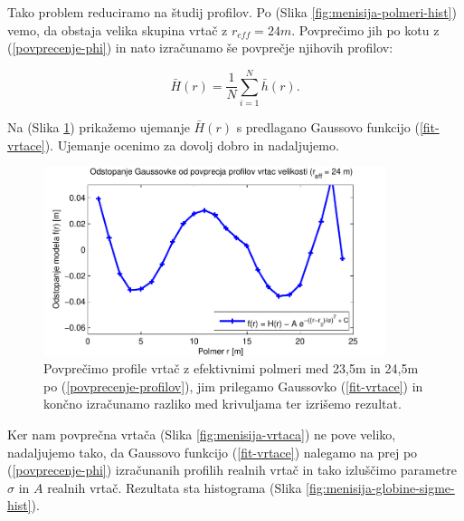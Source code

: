 \documentclass[a4paper, twoside, 12pt]{book}
\begin{document}
Tako problem reduciramo na študij profilov. 
Po (Slika \ref{fig:menisija-polmeri-hist}) vemo, da obstaja velika skupina vrtač z $r_{eff}=24m$. Povprečimo jih po kotu z (\ref{povprecenje-phi}) in nato izračunamo še povprečje njihovih profilov:

\begin{equation} 
  \bar H(r) = \frac{1}{N} \sum_{i=1}^{N} \bar h(r).
  \label{povprecenje-profilov}
\end{equation}

Na (Slika \ref{fig:menisija-profil-21-fit}) prikažemo ujemanje $\bar H(r)$ s predlagano Gaussovo  funkcijo (\ref{fit-vrtace}). Ujemanje ocenimo za dovolj dobro in nadaljujemo.

  \begin{figure}[h!]
    \begin{center}
      \includegraphics[width=10cm]{slike/menisija-profil-21-fit}
    \end{center}
    \caption{Povprečimo profile vrtač z efektivnimi polmeri med 23,5m in 24,5m po (\ref{povprecenje-profilov}), jim prilegamo Gaussovko (\ref{fit-vrtace}) in končno izračunamo razliko med krivuljama ter izrišemo rezultat.}
    \label{fig:menisija-profil-21-fit}
  \end{figure}

Ker nam povprečna vrtača (Slika \ref{fig:menisija-vrtaca}) ne pove veliko, nadaljujemo tako, da Gaussovo funkcijo (\ref{fit-vrtace}) nalegamo na prej po (\ref{povprecenje-phi}) izračunanih profilih realnih vrtač in tako izluščimo parametre $\sigma$ in $A$ realnih vrtač.
Rezultata sta histograma (Slika \ref{fig:menisija-globine-sigme-hist}).
\end{document}
